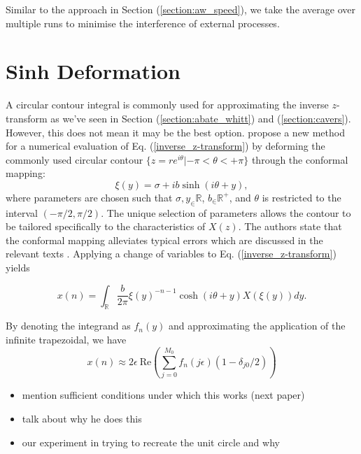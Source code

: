 \documentclass[a4paper]{report}
\begin{document}
Similar to the approach in Section (\ref{section:aw_speed}), we take the average over multiple runs to minimise the interference of external processes.

\section{Sinh Deformation}\label{section:sinh_deformation}
A circular contour integral is commonly used for approximating the inverse $z$-transform as we've seen in Section (\ref{section:abate_whitt}) and (\ref{section:cavers}). However, this does not mean it may be the best option. \citet{levendorskii2022sinh} propose a new method for a numerical evaluation of Eq. (\ref{inverse_z-transform}) by deforming the commonly used circular contour $\{z = re^{i\theta} | -\pi < \theta < +\pi\}$ through the conformal mapping:
\begin{equation}\label{equation:conformal_mapping}
    \xi(y) = \sigma + ib\sinh(i\theta + y),
\end{equation}
where parameters are chosen such that $\sigma,y_\in \mathbb{R}$, $b_\in \mathbb{R}^+$, and $\theta$ is restricted to the interval $(-\pi/2, \pi / 2)$. The unique selection of parameters allows the contour to be tailored specifically to the characteristics of $X(z)$. The authors state that the conformal mapping alleviates typical errors which are discussed in the relevant texts \citep{boyarchenko2014efficient, boyarchenko2019sinh, schmelzer2007computing}.  Applying a change of variables to Eq. (\ref{inverse_z-transform}) yields

\begin{equation}
    x(n) = \int_\mathbb{R} \frac{b}{2\pi} \xi(y)^{-n-1} \cosh(i\theta + y) X(\xi(y)) dy.
\end{equation}

By denoting the integrand as $f_n(y)$ and approximating the application of the infinite trapezoidal, we have 
\begin{equation}
    x(n) \approx 2 \epsilon\ \text{Re}\left( \sum_{j = 0}^{M_0} f_n(j \epsilon)(1 - \delta_{j0}/2) \right)
\end{equation}


\begin{itemize}
    \item mention sufficient conditions under which this works (next paper)
    \item talk about why he does this
    \item our experiment in trying to recreate the unit circle and why
\end{itemize}
\end{document}
